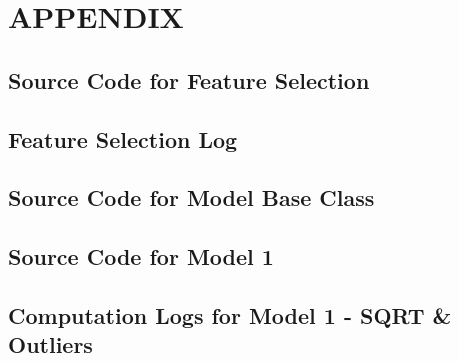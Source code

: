 \chapter{APPENDIX}
\newpage

\footnotesize

%

\newpage
\section{Source Code for Feature Selection}


\newpage
\section{Feature Selection Log}
\begin{landscape}

\end{landscape}

\newpage
\section{Source Code for Model Base Class}



\newpage
\section{Source Code for Model 1}


\begin{landscape}
    \newpage
    \section{Computation Logs for Model 1 - SQRT \& Outliers}
    
\end{landscape}


